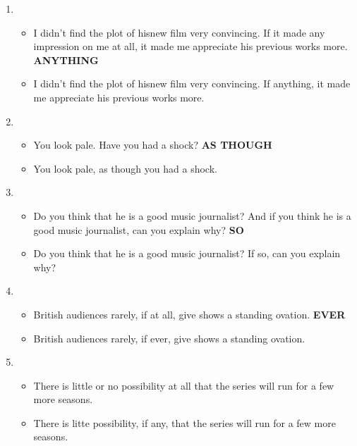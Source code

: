 \documentclass[a4paper]{article}
\begin{document}
\begin{enumerate}
    \item \begin{itemize}
        \item I didn't find the plot of hisnew film very convincing. If it made any impression on me at all, it made me appreciate his previous works more. {\bf ANYTHING}
        \item I didn't find the plot of hisnew film very convincing. If anything, it made me appreciate his previous works more.
    \end{itemize}
    \item \begin{itemize}
        \item You look pale. Have you had a shock? {\bf AS THOUGH}
        \item You look pale, as though you had a shock.
    \end{itemize}
    \item \begin{itemize}
        \item Do you think that he is a good music journalist? And if you think he is a good music journalist, can you explain why? {\bf SO}
        \item Do you think that he is a good music journalist? If so, can you explain why?
    \end{itemize}
    \item \begin{itemize}
        \item British audiences rarely, if at all, give shows a standing ovation. {\bf EVER}
        \item British audiences rarely, if ever, give shows a standing ovation.
    \end{itemize}
    \item \begin{itemize}
        \item There is little or no possibility at all that the series will run for a few more seasons.
        \item There is litte possibility, if any, that the series will run for a few more seasons.
    \end{itemize}
\end{enumerate}
\end{document}
